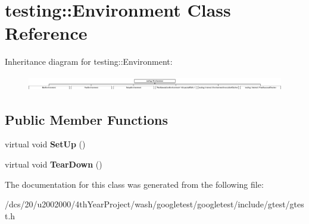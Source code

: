 \hypertarget{classtesting_1_1Environment}{}\section{testing\+:\+:Environment Class Reference}
\label{classtesting_1_1Environment}
Inheritance diagram for testing\+:\+:Environment\+:\begin{figure}[H]
\begin{center}
\leavevmode
\includegraphics[height=0.654971cm]{classtesting_1_1Environment}
\end{center}
\end{figure}
\subsection*{Public Member Functions}
\begin{DoxyCompactItemize}
\item 
\mbox{\label{classtesting_1_1Environment_a1bf8cafaa9d4eba9feb98655ee434eb3}} 
virtual void {\bfseries Set\+Up} ()
\item 
\mbox{\label{classtesting_1_1Environment_a039bdaa705c46b9b88234cf4d3bb6254}} 
virtual void {\bfseries Tear\+Down} ()
\end{DoxyCompactItemize}


The documentation for this class was generated from the following file\+:\begin{DoxyCompactItemize}
\item 
/dcs/20/u2002000/4th\+Year\+Project/wash/googletest/googletest/include/gtest/gtest.\+h\end{DoxyCompactItemize}
